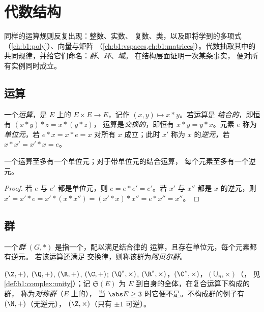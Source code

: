 \chapter{代数结构}\label{ch:b1:structures}

同样的运算规则反复出现：整数、实数、
复数、类，以及即将学到的多项式
（\cref{ch:b1:poly}）、向量与矩阵
（\cref{ch:b1:vspaces,ch:b1:matrices}）。代数抽取其中的
共同规律，并给它们命名：\emph{群}、\emph{环}、\emph{域}。
在结构层面证明一次某条事实，
便对所有实例同时成立。

\section{运算}

\begin{definition}\label{def:b1:structures:law}
一个\emph{运算}，是 $E$ 上的
 $E \times E \to E$，记作 $(x, y) \mapsto x * y$。若运算是
\emph{结合的}，即恒有 $(x*y)*z = x*(y*z)$，
运算是\emph{交换的}，即恒有 $x * y = y * x$。元素 $e$ 称为\emph{单位元}，若
$e * x = x * e = x$ 对所有 $x$ 成立；此时 $x'$ 称为 $x$ 的\emph{逆元}，若
$x * x' = x' * x = e$。
\end{definition}

\begin{proposition}[唯一性]\label{prop:b1:structures:unique}
一个运算至多有一个单位元；对于带单位元的结合运算，
每个元素至多有一个逆元。
\end{proposition}

\begin{proof}
若 $e$ 与 $e'$ 都是单位元，则 $e = e * e' = e'$。若 $x'$ 与 $x''$
都是 $x$ 的逆元，则 $x' = x' * e = x' * (x * x'') = (x' * x) * x'' = e * x''
= x''$。
\end{proof}

\section{群}

\begin{definition}[群]\label{def:b1:structures:group}
一个\emph{群} $(G, *)$ 是指一个，配以满足结合律的
运算，且存在单位元，每个元素都有逆元。
若该运算还满足
交换律，则称该群为\emph{阿贝尔群}。
\end{definition}

\begin{example}\label{ex:b1:structures:groups}
$(\Z, +)$, $(\Q, +)$, $(\R, +)$, $(\C, +)$; $(\Q^*, \times)$,
$(\R^*, \times)$，$(\C^*, \times)$，$(\mathbb{U}_n, \times)$（，
见\cref{def:b1:complex:unity}）；记 $\mathfrak{S}(E)$ 为
 $E$ 到自身的全体，在复合运算下构成的群，
称为\emph{对称群}（$E$ 上的），
当 $\abs E \geq 3$ 时它便不是。不构成群的例子有 $(\N, +)$（无逆元），
$(\Z, \times)$（只有 $\pm 1$ 可逆）。
\end{example}

